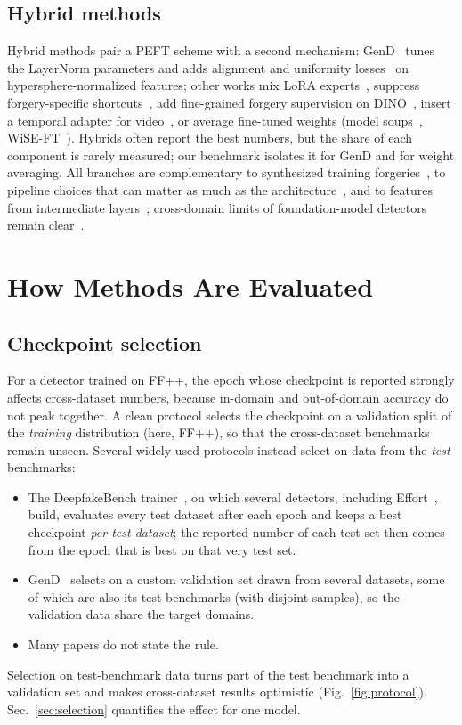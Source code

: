 \documentclass[fonts]{icst}
\begin{document}
\subsection{Hybrid methods}
Hybrid methods pair a PEFT scheme with a second mechanism: GenD~\cite{yermakov2025gend} tunes the LayerNorm parameters and adds alignment and uniformity losses~\cite{wang2020alignment} on hypersphere-normalized features; other works mix LoRA experts~\cite{liu2024mole}, suppress forgery-specific shortcuts~\cite{wang2026shortcut}, add fine-grained forgery supervision on DINO~\cite{zhang2026dino}, insert a temporal adapter for video~\cite{han2024fcg}, or average fine-tuned weights (model soups~\cite{wortsman2022soups}, WiSE-FT~\cite{wortsman2022wiseft}). Hybrids often report the best numbers, but the share of each component is rarely measured; our benchmark isolates it for GenD and for weight averaging. All branches are complementary to synthesized training forgeries~\cite{shiohara2022sbi,chen2022sladd,lin2024cdfa}, to pipeline choices that can matter as much as the architecture~\cite{pellegrini2025design}, and to features from intermediate layers~\cite{park2025mold}; cross-domain limits of foundation-model detectors remain clear~\cite{delibasoglu2026limits}.

\section{How Methods Are Evaluated}
\label{sec:eval}

\subsection{Checkpoint selection}
For a detector trained on FF++, the epoch whose checkpoint is reported strongly affects cross-dataset numbers, because in-domain and out-of-domain accuracy do not peak together. A clean protocol selects the checkpoint on a validation split of the \emph{training} distribution (here, FF++), so that the cross-dataset benchmarks remain unseen. Several widely used protocols instead select on data from the \emph{test} benchmarks:
\begin{itemize}[leftmargin=*, topsep=2pt, itemsep=2pt, label=--]
    \item The DeepfakeBench trainer~\cite{yan2023deepfakebench}, on which several detectors, including Effort~\cite{yan2025effort}, build, evaluates every test dataset after each epoch and keeps a best checkpoint \emph{per test dataset}; the reported number of each test set then comes from the epoch that is best on that very test set.
    \item GenD~\cite{yermakov2025gend} selects on a custom validation set drawn from several datasets, some of which are also its test benchmarks (with disjoint samples), so the validation data share the target domains.
    \item Many papers do not state the rule.
\end{itemize}
Selection on test-benchmark data turns part of the test benchmark into a validation set and makes cross-dataset results optimistic (Fig.~\ref{fig:protocol}). Sec.~\ref{sec:selection} quantifies the effect for one model.
\end{document}
